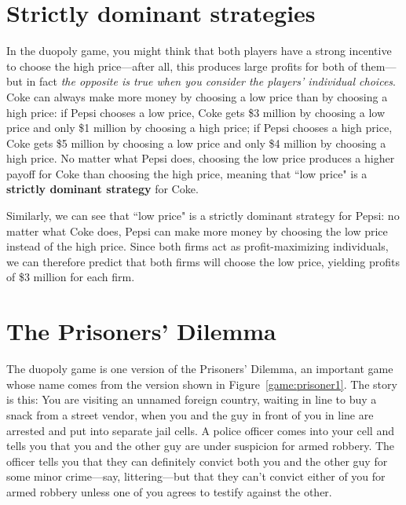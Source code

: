 \section{Strictly dominant strategies}

In the duopoly game, you might think that both players have a strong incentive to choose the high price---after all, this produces large profits for both of them---but in fact \emph{the opposite is true when you consider the players' individual choices}. Coke can always make more money by choosing a low price than by choosing a high price: if Pepsi chooses a low price, Coke gets \$3 million by choosing a low price and only \$1 million by choosing a high price; if Pepsi chooses a high price, Coke gets \$5 million by choosing a low price and only \$4 million by choosing a high price. No matter what Pepsi does, choosing the low price produces a higher payoff for Coke than choosing the high price, meaning that ``low price" is a \textbf{strictly dominant strategy} for Coke.

Similarly, we can see that ``low price" is a strictly dominant strategy for Pepsi: no matter what Coke does, Pepsi can make more money by choosing the low price instead of the high price. Since both firms act as profit-maximizing individuals, we can therefore predict that both firms will choose the low price, yielding profits of \$3 million for each firm.


\section{The Prisoners' Dilemma}

The duopoly game is one version of the Prisoners' Dilemma, an important game whose name comes from the version shown in Figure~\ref{game:prisoner1}. The story is this: You are visiting an unnamed foreign country, waiting in line to buy a snack from a street vendor, when you and the guy in front of you in line are arrested and put into separate jail cells. A police officer comes into your cell and tells you that you and the other guy are under suspicion for armed robbery. The officer tells you that they can definitely convict both you and the other guy for some minor crime---say, littering---but that they can't convict either of you for armed robbery unless one of you agrees to testify against the other.


